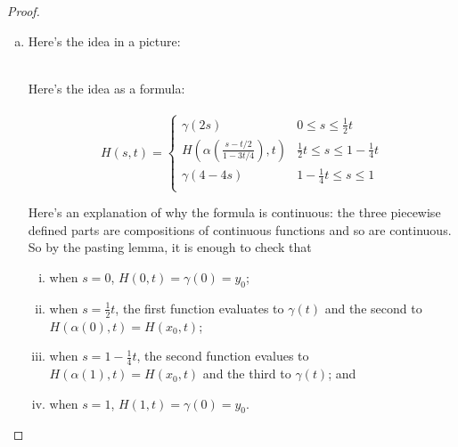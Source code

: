 \documentclass{article}
\begin{document}
\begin{proof} \text{} \\
  \begin{enumerate}[(a)]
    \item
    \begin{multicols}{2}
      Here's the idea in a picture:\\
      \\
      Here's the idea as a formula:
      \\\vspace{0.7cm}\\
      \[
        H(s, t) = \begin{cases}
          \gamma(2s) & 0 \leq s \leq \frac{1}{2}t \\
          \displaystyle H\left(\alpha\left(\frac{s - t/2}{1 - 3t/4}\right), t\right) & \frac{1}{2}t \leq s \leq 1 - \frac{1}{4}t \\
          \gamma(4-4s) & 1 - \frac{1}{4}t \leq s \leq 1 \\
        \end{cases}
      \]
    \end{multicols}
  Here's an explanation of why the formula is continuous: the three piecewise
  defined parts are compositions of continuous functions and so are continuous.
  So by the pasting lemma, it is enough to check that \begin{enumerate}[(i)]
    \item when $s=0$, $H(0, t) = \gamma(0) = y_0$;
    \item when $s = \frac{1}{2}t$, the first function evaluates to $\gamma(t)$ and the second to $H(\alpha(0),t) = H(x_0,t)$;
    \item when $s = 1 - \frac{1}{4}t$, the second function evalues to $H(\alpha(1),t) = H(x_0,t)$ and the third to $\gamma(t)$; and
    \item when $s=1$, $H(1, t) = \gamma(0) = y_0$.

\end{enumerate}
\end{enumerate}
\end{proof}
\end{document}
